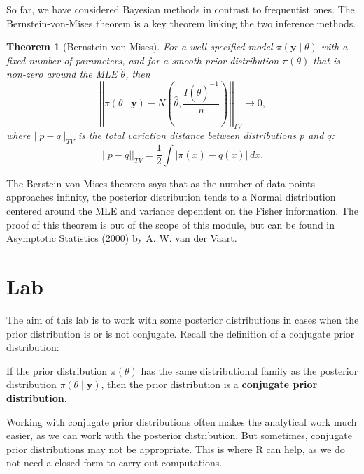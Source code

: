 \documentclass[
]{book}
\newtheorem{theorem}{Theorem}[chapter]
\theoremstyle{definition}
\theoremstyle{definition}
\theoremstyle{definition}
\theoremstyle{definition}
\theoremstyle{remark}
\begin{document}
So far, we have considered Bayesian methods in contrast to frequentist ones. The Bernstein-von-Mises theorem is a key theorem linking the two inference methods.

\begin{theorem}[Bernstein-von-Mises]
For a well-specified model \(\pi(\boldsymbol{y} \mid \theta)\) with a fixed number of parameters, and for a smooth prior distribution \(\pi(\theta)\) that is non-zero around the MLE \(\hat{\theta}\), then
\[
\left|\left| \pi(\theta \mid \boldsymbol{y}) - N\left(\hat{\theta}, \frac{I(\hat{\theta})^{-1}}{n}\right) \right|\right|_{TV} \rightarrow 0,
\]
where \(||p - q||_{TV}\) is the total variation distance between distributions \(p\) and \(q\):
\[
||p - q||_{TV} = \frac{1}{2}\int|\pi(x) - q(x)|\,dx.
\]
\end{theorem}

The Berstein-von-Mises theorem says that as the number of data points approaches infinity, the posterior distribution tends to a Normal distribution centered around the MLE and variance dependent on the Fisher information. The proof of this theorem is out of the scope of this module, but can be found in Asymptotic Statistics (2000) by A. W. van der Vaart.

\section{Lab}\label{lab}

The aim of this lab is to work with some posterior distributions in cases when the prior distribution is or is not conjugate. Recall the definition of a conjugate prior distribution:

If the prior distribution \(\pi(\theta)\) has the same distributional family as the posterior distribution \(\pi(\theta \mid \boldsymbol{y})\), then the prior distribution is a \textbf{conjugate prior distribution}.

Working with conjugate prior distributions often makes the analytical work much easier, as we can work with the posterior distribution. But sometimes, conjugate prior distributions may not be appropriate. This is where R can help, as we do not need a closed form to carry out computations.
\end{document}
